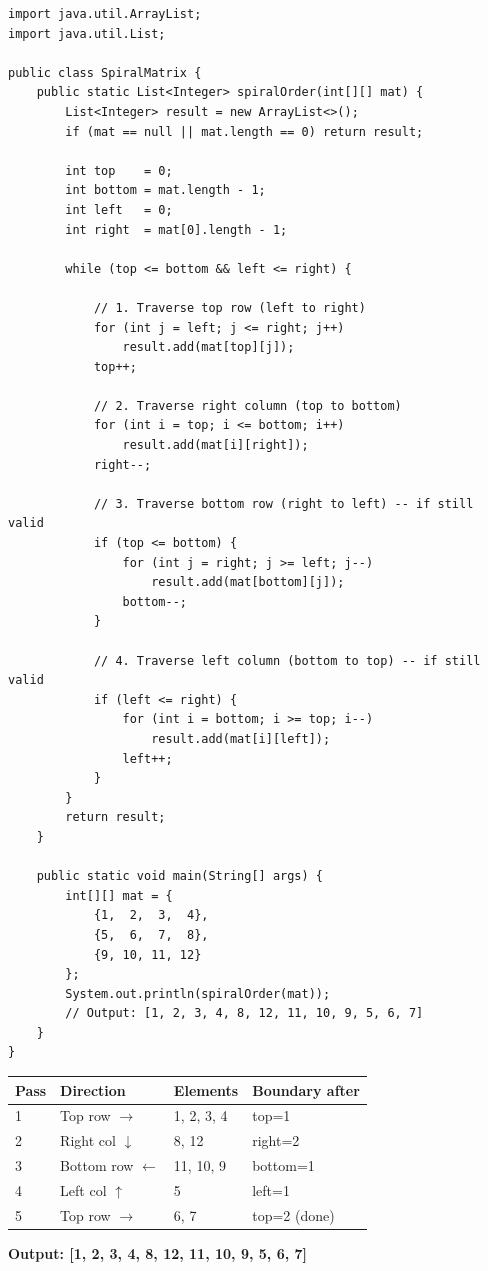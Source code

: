 \documentclass[12pt,a4paper,oneside]{book}
\begin{document}
\begin{lstlisting}[caption={Spiral Matrix --- boundary shrinking approach}]
import java.util.ArrayList;
import java.util.List;

public class SpiralMatrix {
    public static List<Integer> spiralOrder(int[][] mat) {
        List<Integer> result = new ArrayList<>();
        if (mat == null || mat.length == 0) return result;

        int top    = 0;
        int bottom = mat.length - 1;
        int left   = 0;
        int right  = mat[0].length - 1;

        while (top <= bottom && left <= right) {

            // 1. Traverse top row (left to right)
            for (int j = left; j <= right; j++)
                result.add(mat[top][j]);
            top++;

            // 2. Traverse right column (top to bottom)
            for (int i = top; i <= bottom; i++)
                result.add(mat[i][right]);
            right--;

            // 3. Traverse bottom row (right to left) -- if still valid
            if (top <= bottom) {
                for (int j = right; j >= left; j--)
                    result.add(mat[bottom][j]);
                bottom--;
            }

            // 4. Traverse left column (bottom to top) -- if still valid
            if (left <= right) {
                for (int i = bottom; i >= top; i--)
                    result.add(mat[i][left]);
                left++;
            }
        }
        return result;
    }

    public static void main(String[] args) {
        int[][] mat = {
            {1,  2,  3,  4},
            {5,  6,  7,  8},
            {9, 10, 11, 12}
        };
        System.out.println(spiralOrder(mat));
        // Output: [1, 2, 3, 4, 8, 12, 11, 10, 9, 5, 6, 7]
    }
}
\end{lstlisting}

\begin{dryrun}
\begin{center}
\begin{tabular}{llll}
\toprule
\textbf{Pass} & \textbf{Direction} & \textbf{Elements} & \textbf{Boundary after}\\
\midrule
1 & Top row $\to$    & 1, 2, 3, 4    & top=1\\
2 & Right col $\downarrow$ & 8, 12    & right=2\\
3 & Bottom row $\leftarrow$ & 11, 10, 9 & bottom=1\\
4 & Left col $\uparrow$    & 5          & left=1\\
5 & Top row $\to$    & 6, 7          & top=2 (done)\\
\bottomrule
\end{tabular}
\end{center}
\textbf{Output: [1, 2, 3, 4, 8, 12, 11, 10, 9, 5, 6, 7]}
\end{dryrun}
\end{document}
